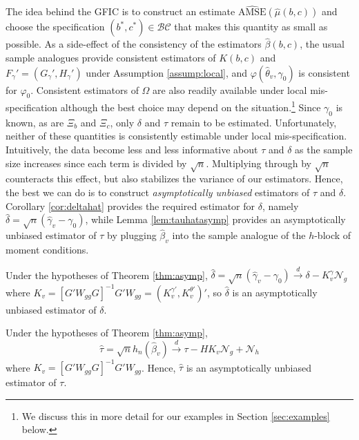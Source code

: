 The idea behind the GFIC is to construct an estimate $\widehat{\mbox{AMSE}}\left(\widehat{\mu}(b,c)\right)$ and choose the specification $(b^*,c^*)\in\mathcal{BC}$ that makes this quantity as small as possible. 
As a side-effect of the consistency of the estimators $\widehat{\beta}(b,c)$, the usual sample analogues provide consistent estimators of $K(b,c)$ and $F_{\gamma}' = (G_\gamma', H_\gamma')$ under Assumption \ref{assump:local}, and $\varphi(\widehat{\theta}_v,\gamma_0)$ is consistent for $\varphi_0$. 
Consistent estimators of $\Omega$ are also readily available under local mis-specification although the best choice may depend on the situation.\footnote{We discuss this in more detail for our examples in Section \ref{sec:examples} below.}
Since $\gamma_0$ is known, as are $\Xi_b$ and $\Xi_c$, only $\delta$ and $\tau$ remain to be estimated. 
Unfortunately, neither of these quantities is consistently estimable under local mis-specification. 
Intuitively, the data become less and less informative about $\tau$ and $\delta$ as the sample size increases since each term is divided by $\sqrt{n}$. 
Multiplying through by $\sqrt{n}$ counteracts this effect, but also stabilizes the variance of our estimators. 
Hence, the best we can do is to construct \emph{asymptotically unbiased} estimators of $\tau$ and $\delta$. 
Corollary \ref{cor:deltahat} provides the required estimator for $\delta$, namely $\widehat{\delta} = \sqrt{n}\left(\widehat{\gamma}_v - \gamma_0\right)$, while Lemma \ref{lem:tauhatasymp} provides an asymptotically unbiased estimator of $\tau$ by plugging $\widehat{\beta}_v$ into the sample analogue of the $h$-block of moment conditions.

\begin{cor} 
\label{cor:deltahat}
Under the hypotheses of Theorem \ref{thm:asymp},
	$\widehat{\delta} = \sqrt{n}\left(\widehat{\gamma}_v - \gamma_0\right) \overset{d}{\rightarrow} \delta - K_{v}^{\gamma} \mathscr{N}_g$
where 
$K_v = \left[G'W_{gg}G\right]^{-1}G'W_{gg} = \left(K_{v}^{\gamma '}, K_{v}^{\theta '}\right)'$, so $\widehat{\delta}$ is an asymptotically unbiased estimator of $\delta$.
\end{cor} 

\begin{lem}
\label{lem:tauhatasymp}
Under the hypotheses of Theorem \ref{thm:asymp},
	$$\widehat{\tau} = \sqrt{n}h_n\left(\widehat{\beta}_v\right) \overset{d}{\rightarrow} \tau - HK_v \mathscr{N}_g + \mathscr{N}_h$$
where $K_v = \left[G'W_{gg}G\right]^{-1}G'W_{gg}$. Hence, $\widehat{\tau}$ is an asymptotically unbiased estimator of $\tau$.
\end{lem}


